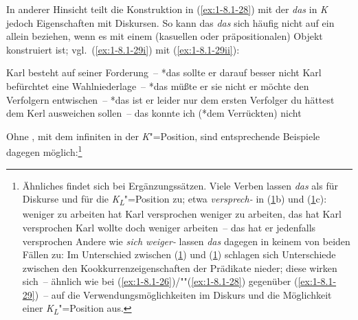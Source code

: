 \documentclass[output=paper]{langsci/langscibook}
\begin{document}
In anderer Hinsicht teilt die Konstruktion in (\ref{ex:1-8.1-28}) mit
der  \textit{das} in \textit{K} jedoch Eigenschaften mit Diskursen. So
kann das \textit{das} sich häufig nicht auf ein  allein beziehen, wenn es
mit einem (kasuellen oder präpositionalen) Objekt konstruiert ist;
vgl.\ (\ref{ex:1-8.1-29i}) mit
(\ref{ex:1-8.1-29ii}):
\begin{exe}
\ex\label{ex:1-8.1-29}
\begin{xlisti}
\ex\label{ex:1-8.1-29i}
\begin{xlista}
\end{xlista}
\ex\label{ex:1-8.1-29ii}
\begin{xlista}
\ex\label{ex:1-8.1-29iia} Karl besteht auf seiner Forderung~– *das sollte er darauf besser nicht
\ex\label{ex:1-8.1-29iib} Karl befürchtet eine Wahlniederlage~– *das müßte er sie nicht
\ex\label{ex:1-8.1-29iic} er möchte den Verfolgern entwischen~– *das ist er leider nur dem ersten
Verfolger
\ex\label{ex:1-8.1-29iid} du hättest dem Kerl ausweichen sollen~-- das konnte ich (*dem Verrückten) nicht
\end{xlista}
\end{xlisti}
\end{exe}
Ohne , mit dem infiniten  in der \textit{K}"=Position, sind entsprechende Beispiele
dagegen möglich:\footnote{%
  Ähnliches findet sich bei Ergänzungssätzen. Viele Verben lassen \textit{das} als  für
  Diskurse und für die \textit{K\textsubscript{L}}"=Position zu; etwa \textit{versprech-} in
  (\ref{ex:1-fn34i}b) und (\ref{ex:1-fn34i}c): 
  \eal
  \label{ex:1-fn34i}
  \ex
  \label{ex:1-fn34ia}
  weniger zu arbeiten hat Karl versprochen
  \ex
  \label{ex:1-fn34ib}
  weniger zu arbeiten, das hat Karl versprochen
  \ex
  \label{ex:1-fn34ic}
  Karl wollte doch weniger arbeiten~-- das hat er jedenfalls versprochen
  \zl
  Andere wie \textit{sich weiger-} lassen \textit{das} dagegen in keinem von beiden Fällen zu:
  \eal
  \label{ex:1-fn34ii}
  \zl
  Im Unterschied zwischen (\ref{ex:1-fn34i}) und (\ref{ex:1-fn34ii}) schlagen sich Unterschiede zwischen den Kookkurrenz\-eigenschaften der Prädikate nieder; diese wirken sich~– ähnlich wie bei (\ref{ex:1-8.1-26})/""(\ref{ex:1-8.1-28}) gegenüber (\ref{ex:1-8.1-29})~-- auf die
  Verwendungsmöglichkeiten im Diskurs und die Möglichkeit einer \textit{K\textsubscript{L}}"=Position
  aus.%
}
\end{document}
